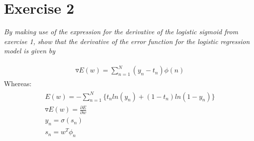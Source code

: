 \documentclass[11pt]{scrartcl} %
\begin{document}
             \vspace{-2mm}
             \section*{Exercise 2}
                      {\it By making use of the expression for the derivative of the logistic sigmoid from exercise 1, show that the derivative of the error function for the logistic regression model is given by}

                      \begin{align*}
                        \begin{aligned}
                          &\triangledown E(w) = \sum_{n=1}^N(y_n-t_n)\phi(n)
                        \end{aligned}
                      \end{align*}
                      Whereas:
                      \begin{align*}
                        \begin{aligned}
                          &E(w)= -\sum_{n=1}^{N}\{t_n ln(y_n) + (1-t_n) ln(1-y_n)\}\\
                          & \triangledown E(w) = \frac{\partial E}{\partial w}\\
                          & y_n = \sigma(s_n)\\
                          & s_n = w^T \phi_n
                        \end{aligned}
                      \end{align*}
\end{document}
